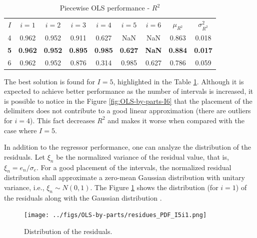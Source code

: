 \documentclass[english]{sobraep}
\begin{document}
\begin{table}[H]
	\centering
	\caption{Piecewise OLS performance - \(R^2\)}
	\footnotesize
	\setlength{\tabcolsep}{5pt}
	\begin{tabular}{ccccccccc}
		\hline
		\multirow{2}{*}{\(I\)} & \multirow{2}{*}{\(i=1\)} & \multirow{2}{*}{\(i=2\)} & \multirow{2}{*}{\(i=3\)} & \multirow{2}{*}{\(i=4\)} & \multirow{2}{*}{\(i=5\)} & \multirow{2}{*}{\(i=6\)} & \multirow{2}{*}{\(\mu_{R^2}\)} & \multirow{2}{*}{\(\sigma_{R^2}^2\)} \\
		&  &  & \\		
		\hline
		4 & 0.962 & 0.952 & 0.911 & 0.627 & NaN & NaN & 0.863 & 0.018 \\
        \hline
		\textbf{5} &  \textbf{0.962}  & \textbf{0.952} & \textbf{0.895} & \textbf{0.985} & \textbf{0.627} & \textbf{NaN} & \textbf{0.884} & \textbf{0.017} \\
		\hline
		6 & 0.962 & 0.952 & 0.876 & 0.314 & 0.985 & 0.627 & 0.786 & 0.059 \\
		\hline
	\end{tabular} \label{tab:OLS-performance}
\end{table}

The best solution is found for \(I=5\), highlighted in the Table \ref{tab:OLS-performance}. Although it is expected to achieve better performance as the number of intervals is increased, it is possible to notice in the Figure \ref{fig:OLS-by-parts-I6} that the placement of the delimiters does not contribute to a good linear approximation (there are outliers for \(i=4\)). This fact decreases \(R^2\) and makes it worse when compared with the case where \(I=5\).

In addition to the regressor performance, one can analyze the distribution of the residuals. Let \(\xi_n\) be the normalized variance of the residual value, that is, \(\xi_n = e_n/\sigma_e\). For a good placement of the intervals, the normalized residual distribution shall approximate a zero-mean Gaussian distribution with unitary variance, i.e., \(\xi_n \sim N(0, 1)\). The Figure \ref{fig:distribution} shows the distribution (for \(i=1\)) of the residuals along with the Gaussian distribution \cite{leon1994probability}.

\begin{figure}[H]
    \centering
    \texttt{[image: ../figs/OLS-by-parts/residues\_PDF\_I5i1.png]}
    \caption{Distribution of the residuals.}
    \label{fig:distribution}
\end{figure}
\end{document}
